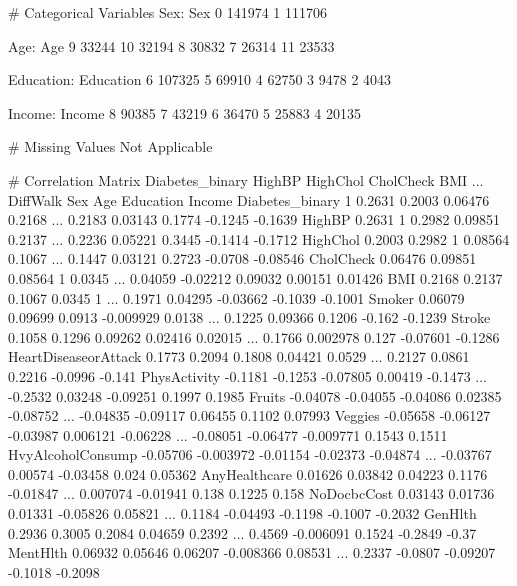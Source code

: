 \documentclass[11pt]{article}
\begin{document}
\begin{codeoutput}
# Categorical Variables
Sex:
Sex
0    141974
1    111706

Age:
Age
9     33244
10    32194
8     30832
7     26314
11    23533

Education:
Education
6    107325
5     69910
4     62750
3      9478
2      4043

Income:
Income
8    90385
7    43219
6    36470
5    25883
4    20135

# Missing Values
Not Applicable

# Correlation Matrix
                     Diabetes_binary    HighBP HighChol CholCheck      BMI  ... DiffWalk       Sex       Age Education   Income
Diabetes_binary                    1    0.2631   0.2003   0.06476   0.2168  ...   0.2183   0.03143    0.1774   -0.1245  -0.1639
HighBP                        0.2631         1   0.2982   0.09851   0.2137  ...   0.2236   0.05221    0.3445   -0.1414  -0.1712
HighChol                      0.2003    0.2982        1   0.08564   0.1067  ...   0.1447   0.03121    0.2723   -0.0708 -0.08546
CholCheck                    0.06476   0.09851  0.08564         1   0.0345  ...  0.04059  -0.02212   0.09032   0.00151  0.01426
BMI                           0.2168    0.2137   0.1067    0.0345        1  ...   0.1971   0.04295  -0.03662   -0.1039  -0.1001
Smoker                       0.06079   0.09699   0.0913 -0.009929   0.0138  ...   0.1225   0.09366    0.1206    -0.162  -0.1239
Stroke                        0.1058    0.1296  0.09262   0.02416  0.02015  ...   0.1766  0.002978     0.127  -0.07601  -0.1286
HeartDiseaseorAttack          0.1773    0.2094   0.1808   0.04421   0.0529  ...   0.2127    0.0861    0.2216   -0.0996   -0.141
PhysActivity                 -0.1181   -0.1253 -0.07805   0.00419  -0.1473  ...  -0.2532   0.03248  -0.09251    0.1997   0.1985
Fruits                      -0.04078  -0.04055 -0.04086   0.02385 -0.08752  ... -0.04835  -0.09117   0.06455    0.1102  0.07993
Veggies                     -0.05658  -0.06127 -0.03987  0.006121 -0.06228  ... -0.08051  -0.06477 -0.009771    0.1543   0.1511
HvyAlcoholConsump           -0.05706 -0.003972 -0.01154  -0.02373 -0.04874  ... -0.03767   0.00574  -0.03458     0.024  0.05362
AnyHealthcare                0.01626   0.03842  0.04223    0.1176 -0.01847  ... 0.007074  -0.01941     0.138    0.1225    0.158
NoDocbcCost                  0.03143   0.01736  0.01331  -0.05826  0.05821  ...   0.1184  -0.04493   -0.1198   -0.1007  -0.2032
GenHlth                       0.2936    0.3005   0.2084   0.04659   0.2392  ...   0.4569 -0.006091    0.1524   -0.2849    -0.37
MentHlth                     0.06932   0.05646  0.06207 -0.008366  0.08531  ...   0.2337   -0.0807  -0.09207   -0.1018  -0.2098

\end{codeoutput}
\end{document}
